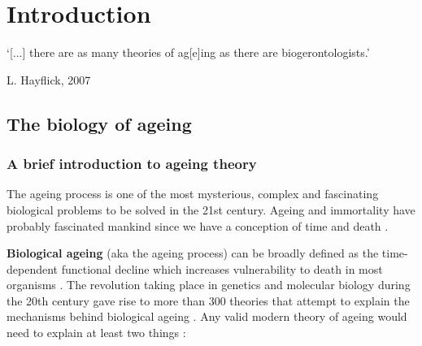 
\chapter{Introduction}  \label{c:1} %

\ifpdf
    \graphicspath{{Chapter1/Figs/Raster/}{Chapter1/Figs/PDF/}{Chapter1/Figs/}}
\else
    \graphicspath{{Chapter1/Figs/Vector/}{Chapter1/Figs/}}
\fi



\epigraph{`[...] there are as many theories of ag[e]ing as there are biogerontologists.'}{L. Hayflick, 2007 \cite{Hayflick2007}}

\section{The biology of ageing} %

\subsection{A brief introduction to ageing theory}

The ageing process is one of the most mysterious, complex and fascinating biological problems to be solved in the 21st century. Ageing and immortality have probably fascinated mankind since we have a conception of time and death \cite{Renfrew2016}. 

\bigskip

\textbf{Biological ageing} (aka the ageing process) can be broadly defined as the time-dependent functional decline which increases vulnerability to death in most organisms \cite{Lopez-Otin2013}. The revolution taking place in genetics and molecular biology during the 20th century gave rise to more than 300 theories that attempt to explain the mechanisms behind biological ageing \cite{Medvedev1990}. Any valid modern theory of ageing would need to explain at least two things \cite{Medvedev1990}:

